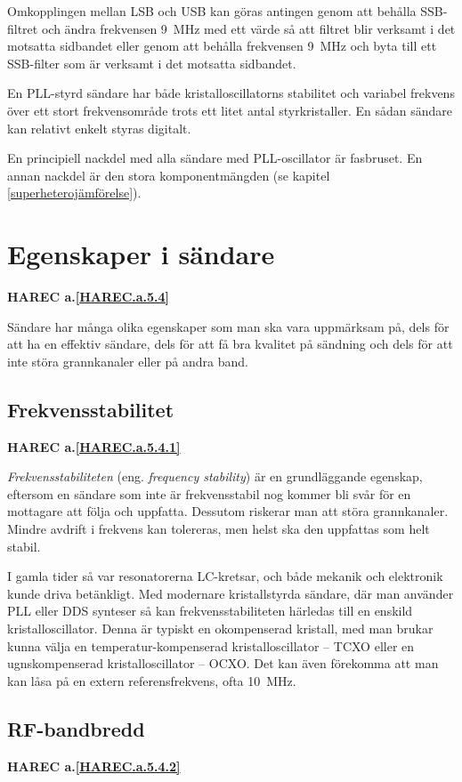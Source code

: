 Omkopplingen mellan LSB och USB kan göras antingen genom att behålla
SSB-filtret och ändra frekvensen 9~MHz med ett värde så att filtret
blir verksamt i det motsatta sidbandet eller genom att behålla
frekvensen 9~MHz och byta till ett SSB-filter som är verksamt i det
motsatta sidbandet.

En PLL-styrd sändare har både kristalloscillatorns stabilitet och variabel
frekvens över ett stort frekvensområde trots ett litet antal styrkristaller.
En sådan sändare kan relativt enkelt styras digitalt.

En principiell nackdel med alla sändare med PLL-oscillator är fasbruset.
En annan nackdel är den stora komponentmängden
(se kapitel \ref{superheterojämförelse}).

\section{Egenskaper i sändare}
\textbf{HAREC
  a.\ref{HAREC.a.5.4}\label{myHAREC.a.5.4}
}

Sändare har många olika egenskaper som man ska vara uppmärksam på, dels för
att ha en effektiv sändare, dels för att få bra kvalitet på sändning och dels
för att inte störa grannkanaler eller på andra band.

\subsection{Frekvensstabilitet}
\textbf{HAREC
  a.\ref{HAREC.a.5.4.1}\label{myHAREC.a.5.4.1}
}

\emph{Frekvensstabiliteten} (eng. \emph{frequency stability}) är en
grundläggande egenskap, eftersom en sändare som inte är frekvensstabil nog
kommer bli svår för en mottagare att följa och uppfatta.
Dessutom riskerar man att störa grannkanaler.
Mindre avdrift i frekvens kan tolereras, men helst ska den uppfattas som
helt stabil.

I gamla tider så var resonatorerna LC-kretsar, och både mekanik och elektronik
kunde driva betänkligt.
Med modernare kristallstyrda sändare, där man använder PLL eller DDS
synteser så kan frekvensstabiliteten härledas till en enskild
kristalloscillator.
Denna är typiskt en okompenserad kristall, med man brukar kunna välja en
temperatur-kompenserad kristalloscillator -- TCXO eller en ugnskompenserad
kristalloscillator -- OCXO.
Det kan även förekomma att man kan låsa på en extern referensfrekvens,
ofta 10~MHz.

\subsection{RF-bandbredd}
\textbf{HAREC
  a.\ref{HAREC.a.5.4.2}\label{myHAREC.a.5.4.2}
}

